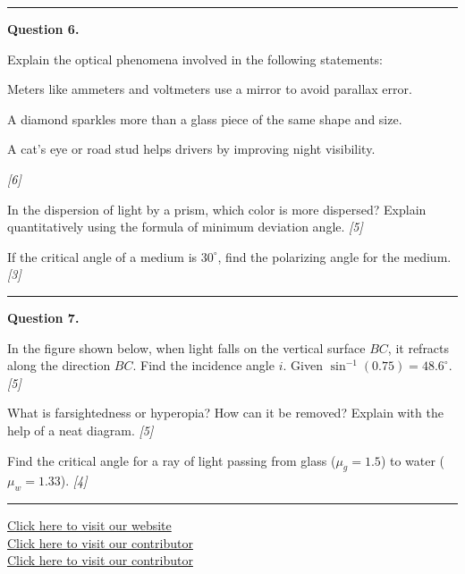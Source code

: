 \documentclass[11pt,a4paper]{article}
\newcommand{\pts}[1]{\hfill   \textit{[#1]}}
\begin{document}
\medskip\rule{\linewidth}{0.2pt}




\noindent   \textbf{Question 6.}

\begin{parts}
  \item Explain the optical phenomena involved in the following statements:
    
\begin{parts}
      \item Meters like ammeters and voltmeters use a mirror to avoid parallax error.
      \item A diamond sparkles more than a glass piece of the same shape and size.
      \item A cat's eye or road stud helps drivers by improving night visibility.
    \end{parts} \pts{6}
  \item In the dispersion of light by a prism, which color is more dispersed? Explain quantitatively using the formula of minimum deviation angle. \pts{5}
  \item If the critical angle of a medium is $30^\circ$, find the polarizing angle for the medium. \pts{3}
\end{parts}

\medskip\rule{\linewidth}{0.2pt}




\noindent   \textbf{Question 7.}

\begin{parts}
  \item In the figure shown below, when light falls on the vertical surface $BC$, it refracts along the direction $BC$. Find the incidence angle $i$. Given $\sin^{-1}(0.75) = 48.6^\circ$. \pts{5}
  \item What is farsightedness or hyperopia? How can it be removed? Explain with the help of a neat diagram. \pts{5}
  \item Find the critical angle for a ray of light passing from glass ($\mu_g = 1.5$) to water ($\mu_w = 1.33$). \pts{4}
\end{parts}

\vfill
\rule{\linewidth}{0.4pt}

\begin{center}\small
  \href{https://bhu-exam.vercel.app/}{Click here to visit our website}\\[4pt]
  \href{https://me-aryan.vercel.app/}{Click here to visit our contributor}\\[4pt]
  \href{https://quashan-me.vercel.app/}{Click here to visit our contributor}
\end{center}
\end{document}
